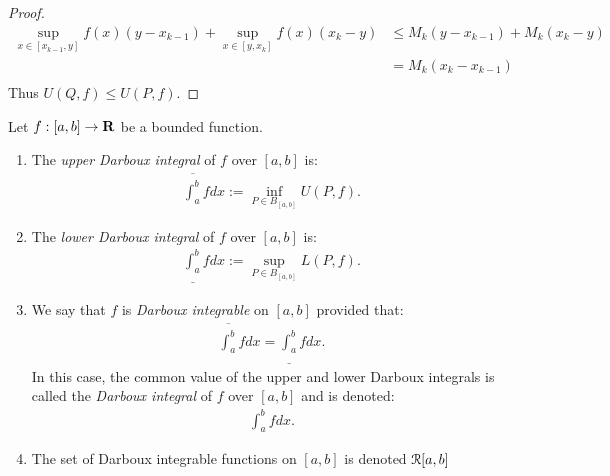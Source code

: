 \documentclass[10pt,twoside,openany]{memoir}
\begin{document}
\begin{proof}
                \begin{equation*}
                \begin{split}
                    \sup_{x \in [x_{k-1},y]} f(x)(y - x_{k-1}) + \sup_{x \in [y,x_{k}]} f(x)(x_{k} - y)
                    & \leq M_k(y-x_{k-1}) + M_k(x_k - y) \\
                    & = M_k(x_k - x_{k-1}) \\
                \end{split}
                \end{equation*}
            Thus $U(Q,f) \leq U(P,f)$.
        \end{proof}

    \begin{definition}
        Let $f:[a,b] \rightarrow \mathbf{R}$ be a bounded function.
            \begin{enumerate}[label = (\arabic*),itemsep=1pt,topsep=3pt]
                \item The \textit{upper Darboux integral} of $f$ over $[a,b]$ is:
                    \begin{equation*}
                    \begin{split}
                        \overline{\int_{a}^{b}}f dx :=\inf_{P \in B_{[a,b]}}U(P,f).
                    \end{split}
                    \end{equation*}
                \item The \textit{lower Darboux integral} of $f$ over $[a,b]$ is:
                \begin{equation*}
                \begin{split}
                    \underline{\int_{a}^{b}}f dx :=\sup_{P \in B_{[a,b]}}L(P,f).
                    \end{split}
                    \end{equation*}

                \item We say that $f$ is \textit{Darboux integrable} on $[a,b]$ provided that:
                    \begin{equation*}
                    \begin{split}
                        \overline{\int_{a}^{b}}f dx = \underline{\int_{a}^{b}}f dx .
                    \end{split}
                    \end{equation*}
                In this case, the common value of the upper and lower Darboux integrals is called the \textit{Darboux integral} of $f$ over $[a,b]$ and is denoted:
                    \begin{equation*}
                    \begin{split}
                        \int_a^b f dx.
                    \end{split}
                    \end{equation*}

                \item The set of Darboux integrable functions on $[a,b]$ is denoted $\mathcal{R}[a,b]$
            \end{enumerate}
    \end{definition}
\end{document}
